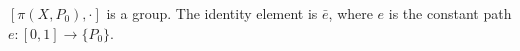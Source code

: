 $[\pi(X, P_0), \cdot]$ is a group. The identity element is $\bar{e}$, where $e$ is the constant path $e: [0,1] \to \{P_0\}$.
